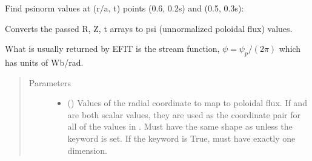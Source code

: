 \documentclass[letterpaper,10pt,english]{sphinxmanual}
\begin{document}
\begin{fulllineitems}
\begin{fulllineitems}
Find psinorm values at (r/a, t) points (0.6, 0.2s) and (0.5, 0.3s):

\begin{sphinxVerbatim}[commandchars=\\\{\}]
    \PYG{p}{[} \PYG{p}{]} \PYG{p}{[} \PYG{p}{]} 
\end{sphinxVerbatim}

\end{fulllineitems}


\begin{fulllineitems}
\label{\detokenize{eqtools:eqtools.core.Equilibrium.rz2psi}}
Converts the passed R, Z, t arrays to psi (unnormalized poloidal flux) values.

What is usually returned by EFIT is the stream function,
\(\psi=\psi_p/(2\pi)\) which has units of Wb/rad.
\begin{quote}\begin{description}
\item[{Parameters}] \leavevmode\begin{itemize}
\item {} 
 () \textendash{} Values of the radial coordinate to
map to poloidal flux. If  and  are both scalar values,
they are used as the coordinate pair for all of the values in
. Must have the same shape as  unless the 
keyword is set. If the  keyword is True,  must
have exactly one dimension.


\end{itemize}
\end{description}
\end{quote}
\end{fulllineitems}
\end{fulllineitems}
\end{document}
